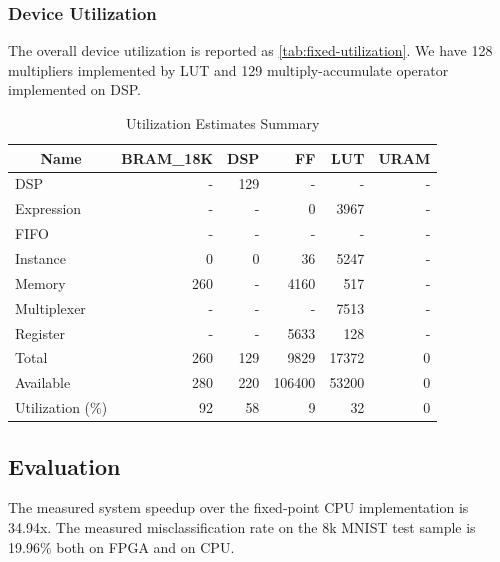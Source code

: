 \subsubsection{Device Utilization}

The overall device utilization is reported as \autoref{tab:fixed-utilization}.
We have 128 multipliers implemented by LUT and 129 multiply-accumulate operator implemented on DSP.

\begin{table}[ht!]
    \centering
    \caption{Utilization Estimates Summary}\label{tab:fixed-utilization}
    \begin{tabular}{lrrrrr}
        \toprule
        \multicolumn{1}{c}{Name} & BRAM\_18K & DSP & FF     & LUT   & URAM \\
        \midrule
        DSP                      & -         & 129 & -      & -     & -    \\
        Expression               & -         & -   & 0      & 3967  & -    \\
        FIFO                     & -         & -   & -      & -     & -    \\
        Instance                 & 0         & 0   & 36     & 5247  & -    \\
        Memory                   & 260       & -   & 4160   & 517   & -    \\
        Multiplexer              & -         & -   & -      & 7513  & -    \\
        Register                 & -         & -   & 5633   & 128   & -    \\
        \midrule
        Total                    & 260       & 129 & 9829   & 17372 & 0    \\
        \midrule
        Available                & 280       & 220 & 106400 & 53200 & 0    \\
        \midrule
        Utilization (\%)         & 92        & 58  & 9      & 32    & 0    \\
        \bottomrule
    \end{tabular}
\end{table}

\subsection{Evaluation}

The measured system speedup over the fixed-point CPU implementation is 34.94x.
The measured misclassification rate on the 8k MNIST test sample is 19.96\% both on FPGA and on CPU.

